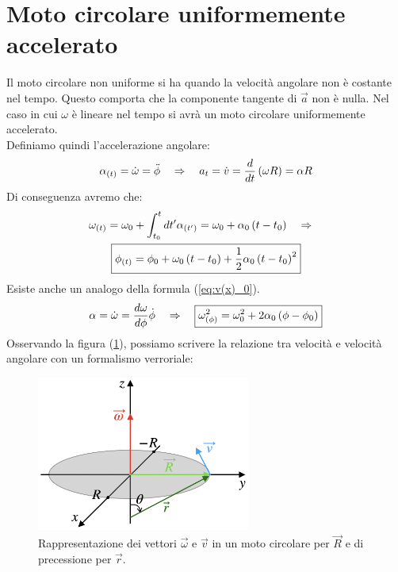 \section{Moto circolare uniformemente accelerato}
Il moto circolare non uniforme si ha quando la velocità angolare non è
costante nel tempo. Questo comporta che la componente tangente di $\vec a$ non è nulla. Nel caso in cui $\omega$ è lineare nel tempo si avrà un moto circolare uniformemente accelerato.
\\ Definiamo quindi l'accelerazione angolare:
\begin{equation}
    \alpha_{(t)} = \dot \omega = \ddot \phi\quad\Rightarrow\quad a_t = \dot v =
    \frac d{dt}\left( \omega R\right) = \alpha R
\end{equation}
Di conseguenza avremo che:
\begin{multline}
    \omega_{(t)} = \omega_0 + \int_{t_0}^tdt'\alpha_{(t')}  = \omega_0 + \alpha_0\left( t - t_0\right) \quad\Rightarrow\quad
    \\\boxed{\phi_{(t)} = \phi_0 + \omega_0\left( t - t_0\right)+ \frac12\alpha_0\left( t - t_0\right)^2}
\end{multline}
Esiste anche un analogo della formula (\ref{eq:v(x)_0}).
\begin{equation}
    \alpha =\dot \omega = \frac{d\omega}{d\phi}\dot\phi\quad\Rightarrow\quad
    \boxed{\omega^2_{(\phi)} = \omega_0^2 + 2\alpha_0\left(\phi-\phi_0\right)}
\label{eq:w(phi)}
\end{equation}
Osservando la figura (\ref{fig:rotantvector}), possiamo scrivere la relazione
tra velocità e velocità angolare con un formalismo verroriale:

\begin{figure}[htbp]
    \centering
        \includegraphics[width=7cm]{images/ovetr.png}
        \caption{Rappresentazione dei vettori $\vec\omega$ e $\vec v$ in un moto
        circolare per $\vec R$ e di precessione per $\vec r$.}
        \label{fig:rotantvector}
\end{figure}

